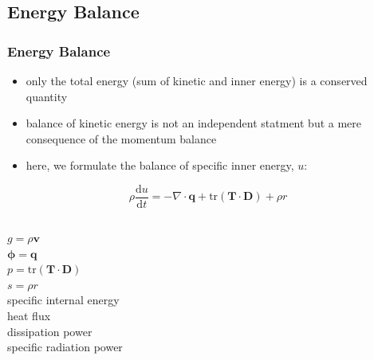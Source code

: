 \documentclass[hide notes,intlimits]{beamer}
\begin{document}
\subsection{Energy Balance}

\begin{frame}
  \frametitle{Energy Balance}
  \begin{itemize}
  \item  only the total energy (sum of kinetic and inner energy) is a \alert{conserved} quantity
  \item balance of kinetic energy is \alert{not an independent statment} but a mere consequence of the momentum balance
  \item here, we formulate the balance of specific inner energy, $u$:
 \end{itemize}
  \begin{equation}
    \rho\frac{\text{d} u}{\text{d} t} = - \nabla \cdot \mathbf{q} + \text{tr}\left(\mathbf{T}\cdot\mathbf{D}\right) + \rho r
 \end{equation}
  \begin{columns}
    \column[C]{3cm}
    $g = \rho \mathbf{v}$ \\
    $\boldsymbol{\phi} = \mathbf{q} $ \\
    $p = \text{tr}\left(\mathbf{T}\cdot\mathbf{D}\right) $ \\
    $s = \rho r$ \\
    \column[C]{6cm}
      specific internal energy \\
      heat flux \\
      dissipation power \\
      specific radiation power
    \end{columns}
\end{frame}
\end{document}

